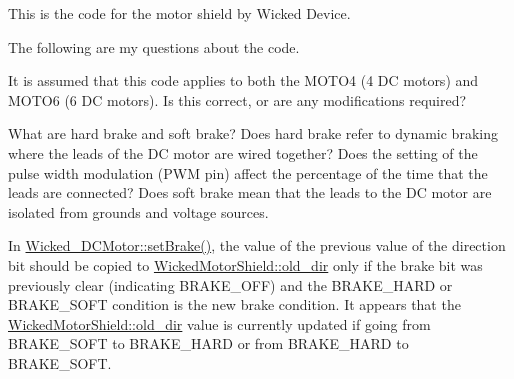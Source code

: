 This is the code for the motor shield by Wicked Device.

The following are my questions about the code.
\begin{DoxyItemize}
\item It is assumed that this code applies to both the M\+O\+T\+O4 (4 DC motors) and M\+O\+T\+O6 (6 DC motors). Is this correct, or are any modifications required?
\item What are hard brake and soft brake? Does hard brake refer to dynamic braking where the leads of the DC motor are wired together? Does the setting of the pulse width modulation (P\+WM pin) affect the percentage of the time that the leads are connected? Does soft brake mean that the leads to the DC motor are isolated from grounds and voltage sources.
\item In \mbox{\hyperlink{class_wicked___d_c_motor_a39e60ca4084d3134ec693815fe2154e1}{Wicked\+\_\+\+D\+C\+Motor\+::set\+Brake()}}, the value of the previous value of the direction bit should be copied to \mbox{\hyperlink{class_wicked_motor_shield_aac68eff7dd860f3811be0f290d70c0bc}{Wicked\+Motor\+Shield\+::old\+\_\+dir}} only if the brake bit was previously clear (indicating B\+R\+A\+K\+E\+\_\+\+O\+FF) and the B\+R\+A\+K\+E\+\_\+\+H\+A\+RD or B\+R\+A\+K\+E\+\_\+\+S\+O\+FT condition is the new brake condition. It appears that the \mbox{\hyperlink{class_wicked_motor_shield_aac68eff7dd860f3811be0f290d70c0bc}{Wicked\+Motor\+Shield\+::old\+\_\+dir}} value is currently updated if going from B\+R\+A\+K\+E\+\_\+\+S\+O\+FT to B\+R\+A\+K\+E\+\_\+\+H\+A\+RD or from B\+R\+A\+K\+E\+\_\+\+H\+A\+RD to B\+R\+A\+K\+E\+\_\+\+S\+O\+FT. 
\end{DoxyItemize}